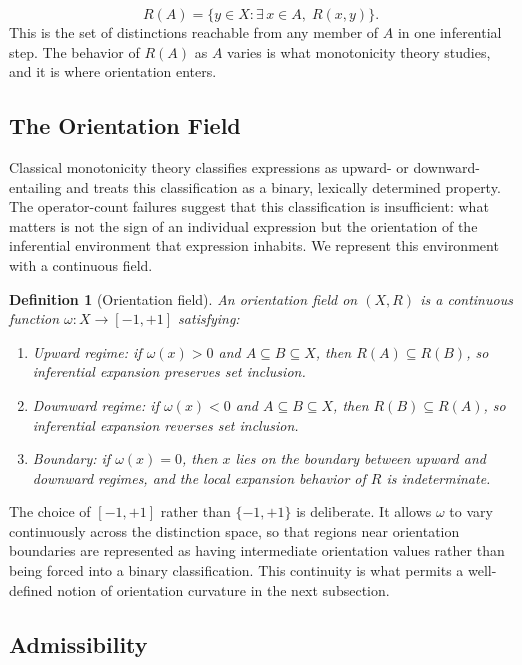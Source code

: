 \documentclass[12pt]{article}
\newtheorem{definition}[theorem]{Definition}
\theoremstyle{remark}
\begin{document}
\[
R(A) = \{ y \in X : \exists\, x \in A,\; R(x,y) \}.
\]
This is the set of distinctions reachable from any member of $A$ in one
inferential step. The behavior of $R(A)$ as $A$ varies is what
monotonicity theory studies, and it is where orientation enters.

\subsection{The Orientation Field}

Classical monotonicity theory classifies expressions as upward- or
downward-entailing and treats this classification as a binary, lexically
determined property. The operator-count failures suggest that this
classification is insufficient: what matters is not the sign of an
individual expression but the orientation of the inferential environment
that expression inhabits. We represent this environment with a continuous
field.

\begin{definition}[Orientation field]
An \emph{orientation field} on $(X, R)$ is a continuous function
$\omega : X \to [-1, +1]$ satisfying:
\begin{enumerate}
\item[(i)] \emph{Upward regime}: if $\omega(x) > 0$ and $A \subseteq B
\subseteq X$, then $R(A) \subseteq R(B)$, so inferential expansion
preserves set inclusion.
\item[(ii)] \emph{Downward regime}: if $\omega(x) < 0$ and $A \subseteq
B \subseteq X$, then $R(B) \subseteq R(A)$, so inferential expansion
reverses set inclusion.
\item[(iii)] \emph{Boundary}: if $\omega(x) = 0$, then $x$ lies on the
boundary between upward and downward regimes, and the local expansion
behavior of $R$ is indeterminate.
\end{enumerate}
\end{definition}

The choice of $[-1,+1]$ rather than $\{-1,+1\}$ is deliberate. It allows
$\omega$ to vary continuously across the distinction space, so that
regions near orientation boundaries are represented as having intermediate
orientation values rather than being forced into a binary classification.
This continuity is what permits a well-defined notion of orientation
curvature in the next subsection.

\subsection{Admissibility}
\end{document}
